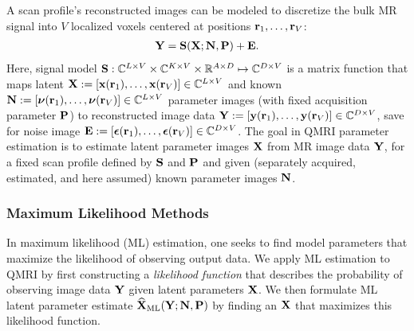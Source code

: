 A scan profile's reconstructed images
can be modeled 
to discretize the bulk MR signal 
into $V$ localized voxels
centered at positions $\mathbf{r}_1,\dots,\mathbf{r}_V$:
\begin{align}
	\bmY = \bmS\paren{\bmX; \bmN, \bmP} + \bmE.
	\label{eq:relax,mod-mtx}
\end{align}
Here, signal model
$\mathbf{S} : \mathbb{C}^{L\times V} \times \mathbb{C}^{K\times V}
\times \mathbb{R}^{A \times D} \mapsto \mathbb{C}^{D \times V}$ 
is a matrix function
that maps latent 
$\bmX := \brac{\bmx\paren{\bmr_1},\dots,\bmx\paren{\bmr_V}} 
\in \complexes{L\times V}$
and known 
$\bmN := \brac{\bmnu\paren{\bmr_1},\dots,\bmnu\paren{\bmr_V}} 
\in \complexes{L\times V}$
parameter images 
(with fixed acquisition parameter $\mathbf{P}$)
to reconstructed image data
$\bmY := \brac{\bmy\paren{\bmr_1},\dots,\bmy\paren{\bmr_V}} 
\in \complexes{D\times V}$,
save for noise image
$\bmE := \brac{\bmeps\paren{\bmr_1},\dots,\bmeps\paren{\bmr_V}} 
\in \complexes{D\times V}$. 
The goal in QMRI parameter estimation
is to estimate latent parameter images $\mathbf{X}$ 
from MR image data $\mathbf{Y}$,
for a fixed scan profile defined by $\mathbf{S}$ and $\mathbf{P}$
and given (separately acquired, estimated, and here assumed)
known parameter images $\mathbf{N}$.

\subsubsection{Maximum Likelihood Methods}
\label{sss,relax,meth,est,ml}

In maximum likelihood (ML) estimation,
one seeks to find model parameters
that maximize the likelihood
of observing output data.
We apply ML estimation to QMRI
by first constructing 
a \emph{likelihood function}
that describes the probability 
of observing image data $\mathbf{Y}$
given latent parameters $\mathbf{X}$.
We then formulate 
ML latent parameter estimate $\estaML{\bmX}{\bmY; \bmN, \bmP}$ 
by finding an $\mathbf{X}$
that maximizes this likelihood function. 

